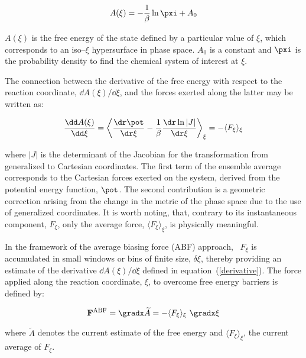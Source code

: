 \begin{equation}
\label{free}
{A(\xi) = -\frac{1}{\beta} \ln \pxi + A_0}
\end{equation}


$A(\xi)$ is the free energy of the state
defined by a particular value of $\xi$, which
corresponds to an iso--$\xi$ hypersurface in
phase space. $A_0$ is a constant and $\pxi$
is the probability density to find the
chemical system of interest at $\xi$.


The connection between
the derivative of the free energy with respect to
the reaction coordinate, $\dd A(\xi) / \dd\xi$,
and the forces exerted along the latter
may be written as:~\cite{spri_98_1, deno_00_1}


\begin{equation}
\label{derivative}
\frac{\dd A(\xi)}{\dd\xi} = \left\langle \frac{\dr\pot}{\dr\xi}
                     - \frac{1}{\beta}
                       \frac{\dr \ln |J|}{\dr\xi} \right\rangle_\xi
                     = -\langle F_\xi \rangle_\xi
\end{equation}


where $|J|$ is the determinant of the Jacobian for the
transformation from generalized to Cartesian coordinates. The
first term of the ensemble average corresponds to the Cartesian
forces exerted on the system, derived from the potential energy
function, $\pot$. The second contribution is a geometric
correction arising from the change in the metric of the phase
space due to the use of generalized coordinates.
It is worth noting, that, contrary to its instantaneous
component, $F_\xi$, only the average force,
$\langle F_\xi \rangle_\xi$, is physically meaningful.


In the framework of the average biasing force (ABF)
approach,~\cite{darv_01_1, rodr_04_1}
$F_\xi$ is accumulated in small windows
or bins of finite size, $\delta \xi$,
thereby providing an estimate of the derivative
$\dd A(\xi) / \dd\xi$ defined in equation~({\ref{derivative}}).
The force applied along the reaction coordinate,
$\xi$, to overcome free energy barriers is defined
by:


\begin{equation}
\label{abf}
{\bf F}^{\rm ABF} = \gradx \widetilde A
                  = - \langle F_\xi \rangle_\xi \ \gradx \xi
\end{equation}


where $\widetilde A$ denotes the current estimate of the
free energy and $\langle F_\xi \rangle_\xi$, the current
average of $F_\xi$.


